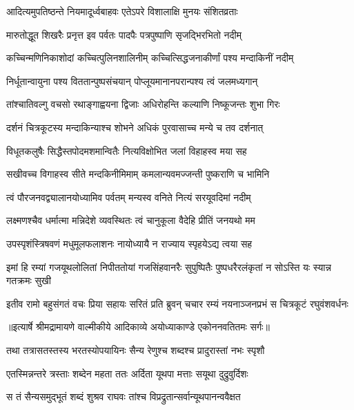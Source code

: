 \twolineshloka
{आदित्यमुपतिष्ठन्ते नियमादूर्ध्वबाहवः}
{एतेऽपरे विशालाक्षि मुनयः संशितव्रताः} %

\twolineshloka
{मारुतोद्धूत शिखरैः प्रनृत्त इव पर्वतः}
{पादपैः पत्रपुष्पाणि सृजद्भिरभितो नदीम्} %

\twolineshloka
{कच्चिन्मणिनिकाशोदां कच्चित्पुलिनशालिनीम्}
{कच्चित्सिद्धजनाकीर्णां पश्य मन्दाकिनीं नदीम्} %

\twolineshloka
{निर्धूतान्वायुना पश्य विततान्पुष्पसंचयान्}
{पोप्लूयमानानपरान्पश्य त्वं जलमध्यगान्} %

\twolineshloka
{तांश्चातिवल्गु वचसो रथाङ्गाह्वयना द्विजाः}
{अधिरोहन्ति कल्याणि निष्कूजन्तः शुभा गिरः} %

\twolineshloka
{दर्शनं चित्रकूटस्य मन्दाकिन्याश्च शोभने}
{अधिकं पुरवासाच्च मन्ये च तव दर्शनात्} %

\twolineshloka
{विधूतकलुषैः सिद्धैस्तपोदमशमान्वितैः}
{नित्यविक्षोभित जलां विहाहस्व मया सह} %

\twolineshloka
{सखीवच्च विगाहस्व सीते मन्दकिनीमिमाम्}
{कमलान्यवमज्जन्ती पुष्कराणि च भामिनि} %

\twolineshloka
{त्वं पौरजनवद्व्यालानयोध्यामिव पर्वतम्}
{मन्यस्व वनिते नित्यं सरयूवदिमां नदीम्} %

\twolineshloka
{लक्ष्मणश्चैव धर्मात्मा मन्निदेशे व्यवस्थितः}
{त्वं चानुकूला वैदेहि प्रीतिं जनयथो मम} %

\twolineshloka
{उपस्पृशंस्त्रिषवणं मधुमूलफलाशनः}
{नायोध्यायै न राज्याय स्पृहयेऽद्य त्वया सह} %

\fourlineindentedshloka
{इमां हि रम्यां गजयूथलोलितां}
{ निपीततोयां गजसिंहवानरैः}
{सुपुष्पितैः पुष्पधरैरलंकृतां}
{ न सोऽस्ति यः स्यान्न गतक्रमः सुखी} %

\fourlineindentedshloka
{इतीव रामो बहुसंगतं वचः}
{ प्रिया सहायः सरितं प्रति ब्रुवन्}
{चचार रम्यं नयनाञ्जनप्रभं}
{ स चित्रकूटं रघुवंशवर्धनः} %


{॥इत्यार्षे श्रीमद्रामायणे वाल्मीकीये आदिकाव्ये अयोध्याकाण्डे एकोननवतितमः सर्गः॥}


\twolineshloka
{तथा तत्रासतस्तस्य भरतस्योपयायिनः}
{सैन्य रेणुश्च शब्दश्च प्रादुरास्तां नभः स्पृशौ} %

\twolineshloka
{एतस्मिन्नन्तरे त्रस्ताः शब्देन महता ततः}
{अर्दिता यूथपा मत्ताः सयूथा दुद्रुवुर्दिशः} %

\twolineshloka
{स तं सैन्यसमुद्भूतं शब्दं शुश्रव राघवः}
{तांश्च विप्रद्रुतान्सर्वान्यूथपानन्ववैक्षत} %

